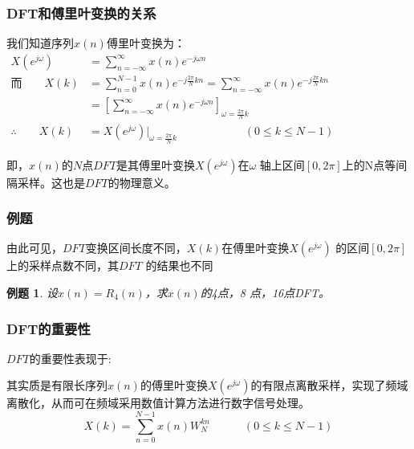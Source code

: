 \documentclass[notheorems,compress,mathserif,table]{beamer}
\newtheorem{example}{例题}
\begin{document}
\begin{frame}[shrink]\frametitle{DFT和傅里叶变换的关系}%
我们知道序列$x(n)$傅里叶变换为：
\begin{equation*}
\begin{split}
 X(e^{j\omega}) &= \sum_{n=-\infty}^{\infty}x(n)e^{-j\omega n}\qquad\qquad\qquad\qquad\qquad\qquad\qquad\qquad\qquad\\
\mbox{而}\qquad    X(k) &= \sum_{n=0}^{N-1}x(n)e^{-j\frac{2\pi}{N}kn}
          = \sum_{n=-\infty}^{\infty}x(n)e^{-j\frac{2\pi}{N}kn}\\
         &= \left[\sum_{n=-\infty}^{\infty}x(n) e^{-j\omega n}\right]_{\omega = \frac{2\pi}{N}k}   \\
\therefore \qquad    X(k) &= X(e^{j\omega})\Big|_{\omega = \frac{2\pi}{N}k} \qquad\qquad\qquad   (0 \leq k \leq N-1)
\end{split}
\end{equation*}

即，$x(n)$的$N$点$DFT$是其傅里叶变换$X(e^{j\omega})$在$\omega$ 轴上区间$[0,2\pi]$上的N点等间隔采样。这也是$DFT$的物理意义。
\end{frame}

\begin{frame}[shrink]\frametitle{例题}%

由此可见，$DFT$变换区间长度不同，$X(k)$在傅里叶变换$X(e^{j\omega})$ 的区间$[0,2\pi]$上的采样点数不同，其$DFT$ 的结果也不同
\begin{example}
设$x(n)=R_4(n)$，求$x(n)$的4点，8 点，16点DFT。
\end{example}
\quad\newline\newline\newline\newline\newline\newline\newline\newline\newline\quad


\end{frame}

\begin{frame}\frametitle{DFT的重要性}%

{\heiti $DFT$的重要性表现于:\par\quad}
\newline
其实质是有限长序列$x(n)$的傅里叶变换$X(e^{j\omega})$的有限点离散采样，实现了频域离散化，从而可在频域采用数值计算方法进行数字信号处理。
$$X(k) = \sum_{n=0}^{N-1}x(n) W_N^{kn} \quad\quad\quad (0 \leq k \leq N-1) $$
\end{frame}
\end{document}
